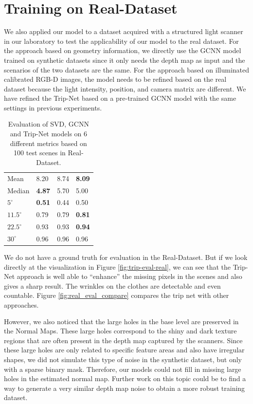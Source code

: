 \section{Training on Real-Dataset}
We also applied our model to a dataset acquired with a structured light scanner in our laboratory to test the applicability of our model to the real dataset. For the approach based on geometry information, we directly use the GCNN model trained on synthetic datasets since it only needs the depth map as input and the scenarios of the two datasets are the same. For the approach based on illuminated calibrated RGB-D images, the model needs to be refined based on the real dataset because the light intensity, position, and camera matrix are different. We have refined the Trip-Net based on a pre-trained GCNN model with the same settings in previous experiments.


\begin{table}[H]
	\centering
	\captionsetup{width=\linewidth}
	\begin{tabular}{l | l l l }
		\toprule
		\tabhead{Metrics} & \tabhead{SVD} & \tabhead{GCNN} & \tabhead{Trip-Net} \\
		\midrule
		Mean  					& 8.20 & 8.74 & \textbf{8.09}\\ 
		\hline
		Median					& \textbf{4.87} & 5.70 & 5.00 \\ 
		\hline
		$ 5^\circ $ 			& \textbf{0.51} & 0.44 & 0.50 \\
		\hline
		$ 11.5^\circ $ 			& 0.79 & 0.79 & \textbf{0.81} \\
		\hline
		$ 22.5^\circ $ 			& 0.93 & 0.93 & \textbf{0.94} \\
		\hline
		$ 30^\circ $ 			& 0.96 & 0.96 & 0.96 \\
		\bottomrule
	\end{tabular}
	\caption{Evaluation of SVD, GCNN and Trip-Net models on 6 different metrics based on 100 test scenes in Real-Dataset.}	
	\label{tab:real_eval}
\end{table}


We do not have a ground truth for evaluation in the Real-Dataset. But if we look directly at the visualization in Figure \ref{fig:trip-eval-real}, we can see that the Trip-Net approach is well able to ``enhance'' the missing pixels in the scenes and also gives a sharp result. The wrinkles on the clothes are detectable and even countable. Figure \ref{fig:real_eval_compare} compares the trip net with other approaches.


However, we also noticed that the large holes in the base level are preserved in the Normal Maps. These large holes correspond to the shiny and dark texture regions that are often present in the depth map captured by the scanners. Since these large holes are only related to specific feature areas and also have irregular shapes, we did not simulate this type of noise in the synthetic dataset, but only with a sparse binary mask. Therefore, our models could not fill in missing large holes in the estimated normal map. Further work on this topic could be to find a way to generate a very similar depth map noise to obtain a more robust training dataset. 

